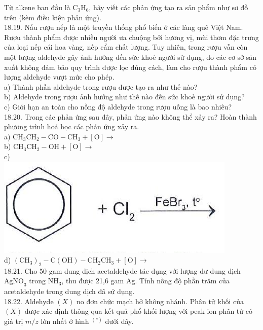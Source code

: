\documentclass[10pt]{article}
\begin{document}
Từ alkene ban đầu là $\mathrm{C}_{3} \mathrm{H}_{6}$, hãy viết các phản ứng tạo ra sản phẩm như sơ đồ trên (kèm điều kiện phản ứng).\\
18.19. Nấu rượu nếp là một truyền thống phổ biến ở các làng quê Việt Nam. Rượu thành phẩm được nhiều người ưa chuộng bởi hương vị, mùi thơm đặc trưng của loại nếp cái hoa vàng, nếp cẩm chất lượng. Tuy nhiên, trong rượu vẫn còn một lượng aldehyde gây ảnh hưởng đến sức khoẻ người sử dụng, do các cơ sở sản xuất không đảm bảo quy trình được lọc đúng cách, làm cho rượu thành phẩm có lượng aldehyde vượt mức cho phép.\\
a) Thành phần aldehyde trong rượu được tạo ra như thế nào?\\
b) Aldehyde trong rượu ảnh hưởng như thế nào đến sức khoẻ người sử dụng?\\
c) Giới hạn an toàn cho nồng độ aldehyde trong rượu uống là bao nhiêu?\\
18.20. Trong các phản ứng sau đây, phản ứng nào không thể xảy ra? Hoàn thành phương trình hoá học các phản ứng xảy ra.\\
a) $\mathrm{CH}_{3} \mathrm{CH}_{2}-\mathrm{CO}-\mathrm{CH}_{3}+[\mathrm{O}] \rightarrow$\\
b) $\mathrm{CH}_{3} \mathrm{CH}_{2}-\mathrm{OH}+[\mathrm{O}] \rightarrow$\\
c)\\
\includegraphics[max width=\textwidth, center]{2025_10_23_ae7aef68fb3b41082d29g-45(2)}\\
d) $\left(\mathrm{CH}_{3}\right)_{2}-\mathrm{C}(\mathrm{OH})-\mathrm{CH}_{2} \mathrm{CH}_{3}+[\mathrm{O}] \rightarrow$\\
18.21. Cho 50 gam dung dịch acetaldehyde tác dụng với lượng dư dung dịch $\mathrm{AgNO}_{3}$ trong $\mathrm{NH}_{3}$, thu được 21,6 gam Ag. Tính nồng độ phần trăm của acetaldehyde trong dung dịch đã sử dụng.\\
18.22. Aldehyde $(X)$ no đơn chức mạch hở không nhánh. Phân tử khối của $(X)$ được xác định thông qua kết quả phổ khối lượng với peak ion phân tử có giá trị $m / z$ lớn nhất ở hình ${ }^{(*)}$ dưới đây.\\
\end{document}

